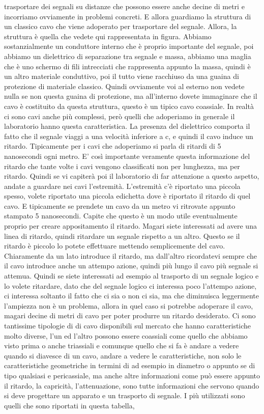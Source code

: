trasportare dei segnali su distanze che possono essere anche decine di metri e incorriamo ovviamente in problemi concreti. E allora guardiamo la struttura di un classico cavo che viene adoperato per trasportare del segnale. Allora, la struttura è quella che vedete qui rappresentata in figura. Abbiamo sostanzialmente un conduttore interno che è proprio importante del segnale, poi abbiamo un dielettrico di separazione tra segnale e massa, abbiamo una maglia che è uno schermo di fili intrecciati che rappresenta appunto la massa, quindi è un altro materiale conduttivo, poi il tutto viene racchiuso da una guaina di protezione di materiale classico. Quindi ovviamente voi al esterno non vedete nulla se non questa guaina di protezione, ma all'interno dovete immaginare che il cavo è costituito da questa struttura, questo è un tipico cavo coassiale. In realtà ci sono cavi anche più complessi, però quelli che adoperiamo in generale il laboratorio hanno questa caratteristica. La presenza del dielettrico comporta il fatto che il segnale viaggi a una velocità inferiore a c, e quindi il cavo induce un ritardo. Tipicamente per i cavi che adoperiamo si parla di ritardi di 5 nanosecondi ogni metro. E' così importante veramente questa informazione del ritardo che tante volte i cavi vengono classificati non per lunghezza, ma per ritardo. Quindi se vi capiterà poi il laboratorio di far attenzione a questo aspetto, andate a guardare nei cavi l'estremità. L'estremità c'è riportato una piccola spesso, volete riportato una piccola edichetta dove è riportato il ritardo di quel cavo. E tipicamente se prendete un cavo da un metro vi ritrovate appunto stampato 5 nanosecondi. Capite che questo è un modo utile eventualmente proprio per creare appositamento il ritardo. Magari siete interessati ad avere una linea di ritardo, quindi ritardare un segnale rispetto a un altro. Questo se il ritardo è piccolo lo potete effettuare mettendo semplicemente del cavo. Chiaramente da un lato introduce il ritardo, ma dall'altro ricordatevi sempre che il cavo introduce anche un attempo azione, quindi più lungo il cavo più segnale si attemua. Quindi se siete interessati ad esempio al trasporto di un segnale logico e lo volete ritardare, dato che del segnale logico ci interessa poco l'attempo azione, ci interessa soltanto il fatto che ci sia o non ci sia, ma che diminuisca leggermente l'ampiezza non è un problema, allora in quel caso si potrebbe adoperare il cavo, magari decine di metri di cavo per poter produrre un ritardo desiderato. Ci sono tantissime tipologie di di cavo disponibili sul mercato che hanno caratteristiche molto diverse, l'un ed l'altro possono essere coassiali come quello che abbiamo visto prima o anche triassiali e comunque quello che si fa è andare a vedere quando si diavesce di un cavo, andare a vedere le caratteristiche, non solo le caratteristiche geometriche in termini di ad esempio in diametro o appunto se di tipo qualsiasi e pericassiale, ma anche altre informazioni come può essere appunto il ritardo, la capricità, l'attenuazione, sono tutte informazioni che servono quando si deve progettare un apparato e un trasporto di segnale. I più utilizzati sono quelli che sono riportati in questa tabella, 

